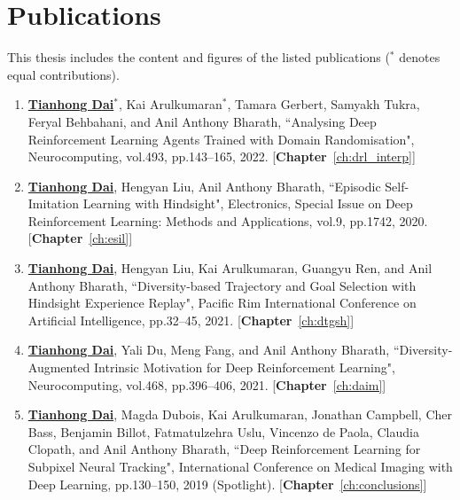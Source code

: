 \section{Publications}
This thesis includes the content and figures of the listed publications ($^{*}$ denotes equal contributions).
\begin{enumerate}
	\item \underline{\textbf{Tianhong Dai}$^{*}$}, Kai Arulkumaran$^{*}$, Tamara Gerbert, Samyakh Tukra, Feryal Behbahani, and Anil Anthony Bharath, ``Analysing Deep Reinforcement Learning Agents Trained with Domain Randomisation", Neurocomputing, vol.493, pp.143--165, 2022. [\textbf{Chapter}~\ref{ch:drl_interp}]
	\item \underline{\textbf{Tianhong Dai}}, Hengyan Liu, Anil Anthony Bharath, ``Episodic Self-Imitation Learning with Hindsight", Electronics, Special Issue on Deep Reinforcement Learning: Methods and Applications, vol.9, pp.1742, 2020. [\textbf{Chapter}~\ref{ch:esil}]
	\item \underline{\textbf{Tianhong Dai}}, Hengyan Liu, Kai Arulkumaran, Guangyu Ren, and Anil Anthony Bharath, ``Diversity‐based Trajectory and Goal Selection with Hindsight Experience Replay", Pacific Rim International Conference on Artificial Intelligence, pp.32--45, 2021. [\textbf{Chapter}~\ref{ch:dtgsh}]
	\item \underline{\textbf{Tianhong Dai}}, Yali Du, Meng Fang, and Anil Anthony Bharath, ``Diversity-Augmented Intrinsic Motivation for Deep Reinforcement Learning", Neurocomputing, vol.468, pp.396--406, 2021. [\textbf{Chapter}~\ref{ch:daim}]
	\item \underline{\textbf{Tianhong Dai}}, Magda Dubois, Kai Arulkumaran, Jonathan Campbell, Cher Bass, Benjamin Billot, Fatmatulzehra Uslu, Vincenzo de Paola, Claudia Clopath, and Anil Anthony Bharath, ``Deep Reinforcement Learning for Subpixel Neural Tracking", International Conference on Medical Imaging with Deep Learning, pp.130--150, 2019 (Spotlight). [\textbf{Chapter}~\ref{ch:conclusions}]
\end{enumerate}


